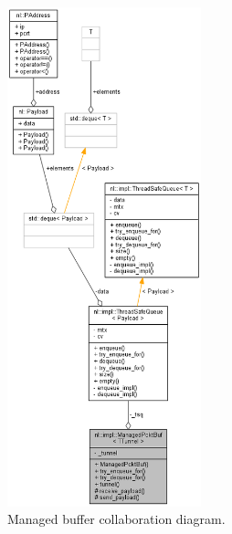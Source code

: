 \documentclass[11pt]{report}
\newcommand{\+}{\discretionary{\mbox{\scriptsize$\hookleftarrow$}}{}{}}
\begin{document}
                \begin{figure}[H]
                \caption{Managed buffer collaboration diagram.}
                \centering
                \includegraphics[width=0.5\textwidth]{d/coll/coll_pcktbuf.png}
                \end{figure}

                \newpage
\end{document}

